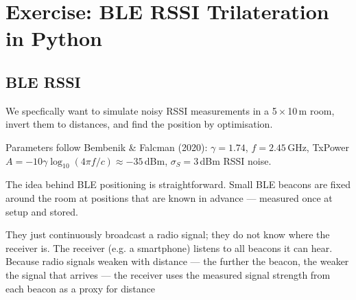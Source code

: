 \documentclass[12pt, a4paper]{article}
\begin{document}
\clearpage
\section*{Exercise: BLE RSSI Trilateration in Python}
\vspace{-0.3cm}
\subsection*{BLE RSSI}
\begin{warnbox}
We specfically want to simulate noisy RSSI measurements in a 5\,$\times$\,10\,m room,
invert them to distances, and find the position by optimisation.

Parameters follow Bembenik \& Falcman (2020): $\gamma = 1.74$,
$f = 2.45$\,GHz, TxPower $A = -10\gamma\log_{10}(4\pi f/c)
\approx -35$\,dBm, $\sigma_S = 3$\,dBm RSSI noise.
\end{warnbox}

The idea behind BLE positioning is straightforward. Small BLE beacons are fixed around the room at positions that are known in advance — measured once at setup and stored.

They just continuously broadcast a radio signal; they do not know where the receiver is.
The receiver (e.g. a smartphone) listens to all beacons it can hear. 
Because radio signals weaken with distance — the further the beacon, the weaker the signal that arrives — 
the receiver uses the measured signal strength from each beacon as a proxy for distance
\end{document}

